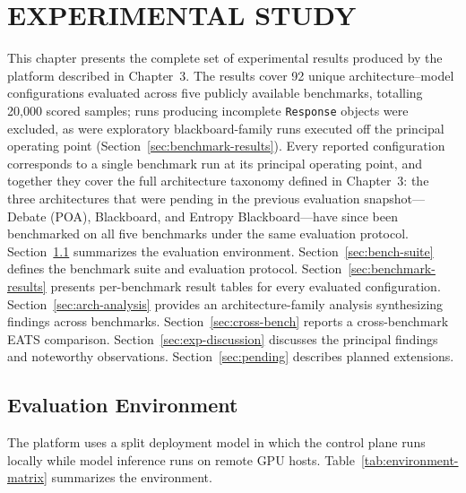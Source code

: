 \chapter{EXPERIMENTAL STUDY}

This chapter presents the complete set of experimental results produced by the platform described in Chapter~3. The results cover 92 unique architecture--model configurations evaluated across five publicly available benchmarks, totalling 20{,}000 scored samples; runs producing incomplete \texttt{Response} objects were excluded, as were exploratory blackboard-family runs executed off the principal operating point (Section~\ref{sec:benchmark-results}). Every reported configuration corresponds to a single benchmark run at its principal operating point, and together they cover the full architecture taxonomy defined in Chapter~3: the three architectures that were pending in the previous evaluation snapshot---Debate (POA), Blackboard, and Entropy Blackboard---have since been benchmarked on all five benchmarks under the same evaluation protocol. Section~\ref{sec:eval-env} summarizes the evaluation environment. Section~\ref{sec:bench-suite} defines the benchmark suite and evaluation protocol. Section~\ref{sec:benchmark-results} presents per-benchmark result tables for every evaluated configuration. Section~\ref{sec:arch-analysis} provides an architecture-family analysis synthesizing findings across benchmarks. Section~\ref{sec:cross-bench} reports a cross-benchmark EATS comparison. Section~\ref{sec:exp-discussion} discusses the principal findings and noteworthy observations. Section~\ref{sec:pending} describes planned extensions.

\section{Evaluation Environment}
\label{sec:eval-env}

The platform uses a split deployment model in which the control plane runs locally while model inference runs on remote GPU hosts. Table~\ref{tab:environment-matrix} summarizes the environment.

